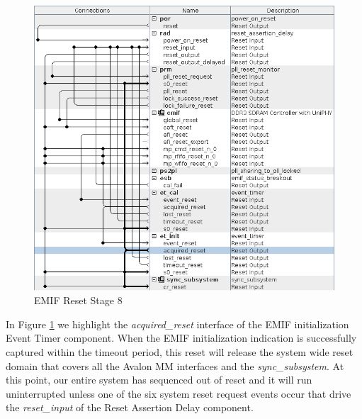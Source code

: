 \documentclass{article}
\begin{document}
\begin{flushleft}
\begin{figure}[H]
\centering
\includegraphics[scale=0.675]{emif_reset_stage_8}
\caption{EMIF Reset Stage 8}
\label{fig:emif_reset_stage_8}
\end{figure}

In Figure \ref{fig:emif_reset_stage_8} we highlight the \emph{acquired\_reset} interface of the EMIF initialization Event Timer component.  When the EMIF initialization indication is successfully captured within the timeout period, this reset will release the system wide reset domain that covers all the Avalon MM interfaces and the \emph{sync\_subsystem}.  At this point, our entire system has sequenced out of reset and it will run uninterrupted unless one of the six system reset request events occur that drive the \emph{reset\_input} of the Reset Assertion Delay component.

\end{flushleft}

\end{document}

